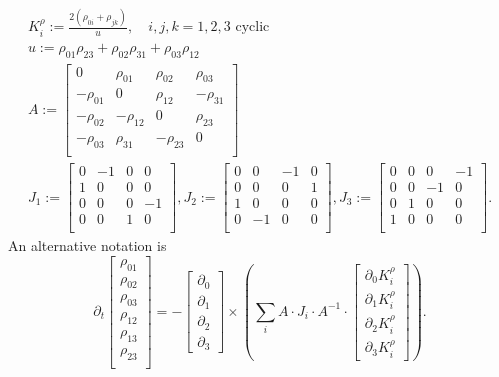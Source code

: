 \documentclass[a4paper]{article}
\newcommand{\p}{{\partial}}
\begin{document}
\begin{gather*}
K_i^\rho := \frac{2(\rho_{0i} + \rho_{jk})}{u}, \quad i,j,k = 1,2,3\text{ cyclic}\\
u := \rho_{01}\rho_{23} + \rho_{02}\rho_{31} + \rho_{03}\rho_{12}\\
A:= \left[
\begin{array}{cccc}
0 & \rho_{0 1} & \rho_{0 2} & \rho_{0 3} \\
 - \rho_{0 1} & 0 & \rho_{1 2} &  - \rho_{3 1} \\
 - \rho_{0 2} &  - \rho_{1 2} & 0 & \rho_{2 3} \\
 - \rho_{0 3} & \rho_{3 1} &  - \rho_{2 3} & 0 \\
\end{array}
\right]\\
J_1 := \left[
\begin{array}{cccc}
0 & -1 & 0 & 0 \\
1 & 0 & 0 & 0 \\
0 & 0 & 0 & -1 \\
0 & 0 & 1 & 0 \\
\end{array}
\right], 
J_2 := \left[
\begin{array}{cccc}
0 & 0 & -1 & 0 \\
0 & 0 & 0 & 1 \\
1 & 0 & 0 & 0 \\
0 & -1 & 0 & 0 \\
\end{array}
\right],
J_3 := \left[
\begin{array}{cccc}
0 & 0 & 0 & -1 \\
0 & 0 & -1 & 0 \\
0 & 1 & 0 & 0 \\
1 & 0 & 0 & 0 \\
\end{array}
\right].
\end{gather*}
An alternative notation is
\begin{equation*}
\p_t \left[
\begin{array}{c}
\rho_{0 1} \\
\rho_{0 2} \\
\rho_{0 3} \\
\rho_{1 2} \\
\rho_{1 3} \\
\rho_{2 3} \\ 
\end{array}
\right] = - 
\left[\begin{array}{c}
\p_0 \\
\p_1 \\
\p_2 \\
\p_3
\end{array}
\right] \times \left(
\sum_i A \cdot J_i \cdot A^{-1} \cdot
\left[\begin{array}{c}
\p_0 K_i^\rho \\
\p_1 K_i^\rho \\
\p_2 K_i^\rho \\
\p_3 K_i^\rho
\end{array}
\right]\right).
\end{equation*}
\end{document}
